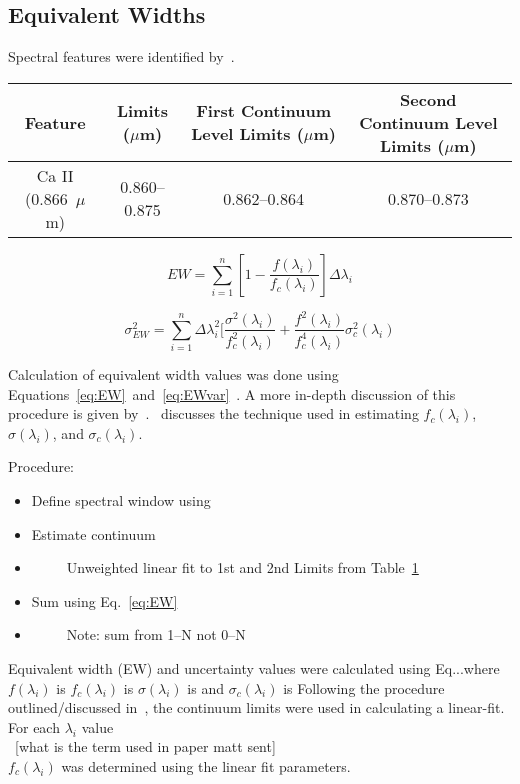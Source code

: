 \subsection{Equivalent Widths}


Spectral features were identified by~\cite{Rayner_2009}.  

\begin{table}[H]
	\begin{tabular}{c|c|c|c}
	\label{tab:features}
		Feature & Limits ($\mu$m) & First Continuum Level Limits ($\mu$m) & Second Continuum Level Limits ($\mu$m) \\ \hline
		Ca II (0.866~$\mu$m) & 0.860--0.875 & 0.862--0.864 & 0.870--0.873 \\
	\end{tabular}
\end{table}

\begin{equation}\label{eq:EW}
	EW = \sum_{i=1}^{n} [1 - \frac{f(\lambda_{i})}{f_{c}(\lambda_{i})}] \Delta\lambda_{i}
\end{equation}

\begin{equation}\label{eq:EWvar}
	\sigma_{EW}^{2} = \sum_{i=1}^{n} \Delta\lambda_{i}^{2} [\frac{\sigma^{2}(\lambda_{i})}{f_{c}^{2}(\lambda_{i})} + \frac{f^{2}(\lambda_{i})}{f_{c}^{4}(\lambda_{i})}\sigma_{c}^{2}(\lambda_{i})
\end{equation}


Calculation of equivalent width values was done using Equations~\ref{eq:EW}~and~\ref{eq:EWvar}~\cite{Cushing_2005}.  A more in-depth discussion of this procedure is given by~\cite{Cushing_2005}.  \cite{Sembach_1992}~discusses the technique used in estimating $f_{c}(\lambda_{i})$, $\sigma(\lambda_{i})$, and $\sigma_{c}(\lambda_{i})$.

Procedure:\\
\begin{itemize}
	\item{} Define spectral window using
	\item{} Estimate continuum
	\item{}~~~~~Unweighted linear fit to 1st and 2nd Limits from Table~\ref{tab:features}
	\item{} Sum using Eq.~\ref{eq:EW}
	\item{}~~~~~Note: sum from 1--N not 0--N
\end{itemize}



Equivalent width (EW) and uncertainty values were calculated using Eq...where $f(\lambda_{i})$ is
$f_{c}(\lambda_{i})$ is
$\sigma(\lambda_{i})$ is
and $\sigma_{c}(\lambda_{i})$ is
Following the procedure outlined/discussed in~\cite{Cushing_2005}, the continuum limits were used in calculating a linear-fit.  For each $\lambda_{i}$ value\\
~[what is the term used in paper matt sent]\\
$f_{c}(\lambda_{i})$ was determined using the linear fit parameters.
